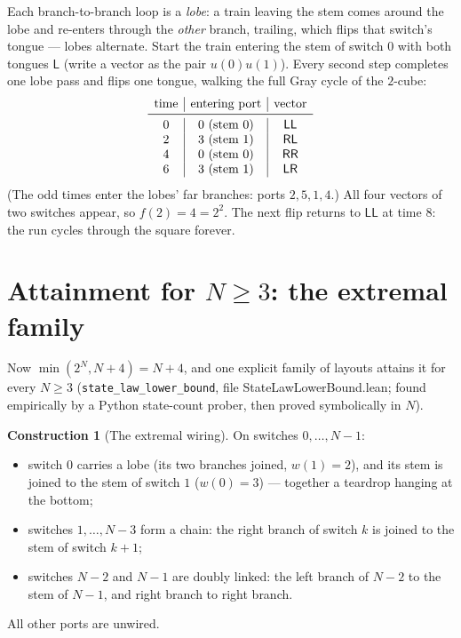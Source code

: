 \documentclass[11pt]{article}
\theoremstyle{definition}
\newtheorem{construction}[theorem]{Construction}
\newcommand{\lean}[1]{\texttt{#1}}
\newcommand{\file}[1]{\textsf{#1}}
\newcommand{\Left}{\mathsf{L}}
\newcommand{\Right}{\mathsf{R}}
\begin{document}
Each branch-to-branch loop is a \emph{lobe}: a train leaving the stem
comes around the lobe and re-enters through the \emph{other} branch,
trailing, which flips that switch's tongue --- lobes alternate.  Start
the train entering the stem of switch $0$ with both tongues $\Left$
(write a vector as the pair $u(0)u(1)$).  Every second step completes one
lobe pass and flips one tongue, walking the full Gray cycle of the
$2$-cube:
\[
\begin{array}{c|c|c}
  \text{time} & \text{entering port} & \text{vector}\\\midrule
  0 & 0 \text{ (stem }0\text{)} & \Left\Left\\
  2 & 3 \text{ (stem }1\text{)} & \Right\Left\\
  4 & 0 \text{ (stem }0\text{)} & \Right\Right\\
  6 & 3 \text{ (stem }1\text{)} & \Left\Right
\end{array}
\]
(The odd times enter the lobes' far branches: ports $2, 5, 1, 4$.)  All
four vectors of two switches appear, so $f(2) = 4 = 2^2$.  The next flip
returns to $\Left\Left$ at time $8$: the run cycles through the square
forever.

\section{Attainment for $N \ge 3$: the extremal family}\label{sec:family}

Now $\min(2^N, N+4) = N+4$, and one explicit family of layouts attains
it for every $N \ge 3$ (\lean{state\_law\_lower\_bound}, file
\file{StateLawLowerBound.lean}; found empirically by a Python state-count
prober, then proved symbolically in $N$).

\begin{construction}[The extremal wiring]\label{con:family}
  On switches $0,\dots,N-1$:
  \begin{itemize}
  \item switch $0$ carries a lobe (its two branches joined,
    $w(1) = 2$), and its stem is joined to the stem of switch $1$
    ($w(0) = 3$) --- together a teardrop hanging at the bottom;
  \item switches $1,\dots,N-3$ form a chain: the right branch of switch
    $k$ is joined to the stem of switch $k+1$;
  \item switches $N-2$ and $N-1$ are doubly linked: the left branch of
    $N-2$ to the stem of $N-1$, and right branch to right branch.
  \end{itemize}
  All other ports are unwired.
\end{construction}
\end{document}
